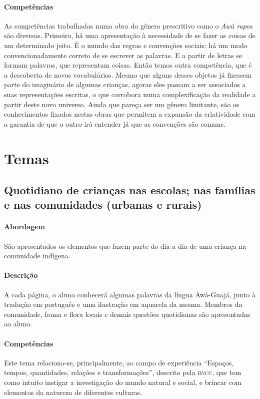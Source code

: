 \documentclass[11pt]{extarticle}
\begin{document}
\paragraph{Competências} 
As competências trabalhadas numa obra do gênero prescritivo como o 
\emph{Awá rapea} são diversas. 
Primeiro, há uma apresentação à necessidade de se fazer as coisas de um 
determinado jeito. É o mundo das regras e convenções sociais: há um modo 
convencionadamente correto de se escrever as palavras. E a partir de letras 
se formam palavras, que representam coisas. Então temos outra competência, 
que é a descoberta de novos vocabulários. Mesmo que alguns desses objetos já 
fizessem parte do imaginário de algumas crianças, agoras eles passam
a ser associados a suas representações escritas, o que corrobora numa complexificação
da realidade a partir deste novo universo. Ainda que pareça ser um gênero
limitante, são os conhecimentos fixados nestas obras que permitem a expansão
da criatividade com a garantia de que o outro irá entender já que as convenções são comuns.

\section{Temas}

\subsection{Quotidiano de crianças nas escolas; nas famílias e nas comunidades (urbanas e rurais)}

\paragraph{Abordagem} 
São apresentados os elementos que fazem parte do dia a dia de uma criança na comunidade indígena.
\paragraph{Descrição} 
A cada página, o aluno conhecerá algumas palavras da língua Awá-Guajá, junto à tradução em português
e uma ilustração em aquarela da mesma. Membros da comunidade, fauna e flora locais e demais questões
quotidianas são apresentadas ao aluno.
\paragraph{Competências} 
Este tema relaciona-se, principalmente, ao campo de experiência ``Espaços, tempos, quantidades, relações e transformações'',
descrito pela \textsc{bncc}, que tem como intuito instigar a investigação
do mundo natural e social, e brincar com elementos da natureza de diferentes culturas.
\end{document}
